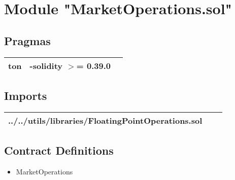 
\section{Module "MarketOperations.sol"}


\subsection{Pragmas}


\noindent\begin{tabular}{|l|l|p{5cm}|}\hline
ton & -solidity $>$= 0.39.0 &\\\hline
\end{tabular}


\subsection{Imports}


\noindent\begin{tabular}{|l|l|p{5cm}|}\hline
../../utils/libraries/FloatingPointOperations.sol &\\\hline
\end{tabular}


\subsection{Contract Definitions}

\begin{itemize}
\item MarketOperations
\end{itemize}
